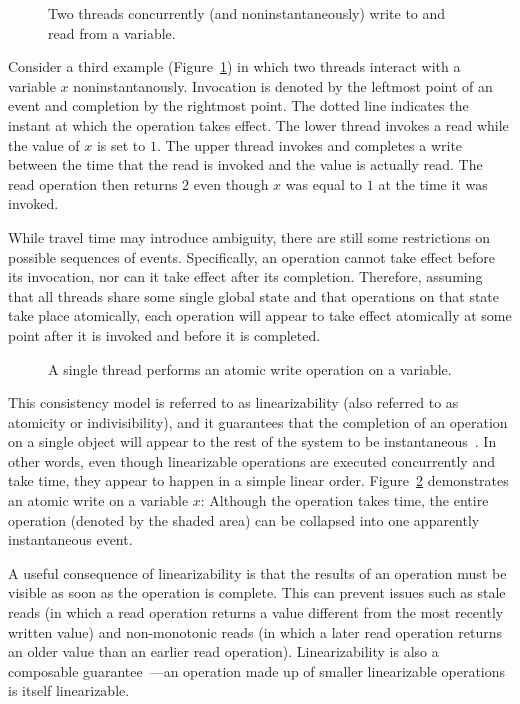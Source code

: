 \documentclass{sig-alternate}
\begin{document}
\begin{figure}[h]
  \centering
  \resizebox{0.63\linewidth}{!}{}
  \caption{Two threads concurrently (and noninstantaneously) write to and read from a variable.}
\label{figure:time}
\end{figure}

Consider a third example (Figure~\ref{figure:time}) in which two threads interact with a variable $x$ noninstantanously. Invocation is denoted by the leftmost point of an event and completion by the rightmost point. The dotted line indicates the instant at which the operation takes effect. The lower thread invokes a read while the value of $x$ is set to $1$. The upper thread invokes and completes a write between the time that the read is invoked and the value is actually read. The read operation then returns $2$ even though $x$ was equal to $1$ at the time it was invoked.

While travel time may introduce ambiguity, there are still some restrictions on possible sequences of events. Specifically, an operation cannot take effect before its invocation, nor can it take effect after its completion. Therefore, assuming that all threads share some single global state and that operations on that state take place atomically, each operation will appear to take effect atomically at some point after it is invoked and before it is completed.

\begin{figure}[h]
  \centering
  \resizebox{0.63\linewidth}{!}{}
  \caption{A single thread performs an atomic write operation on a variable.}
\label{figure:linearizability}
\end{figure}

This consistency model is referred to as linearizability (also referred to as atomicity or indivisibility), and it guarantees that the completion of an operation on a single object will appear to the rest of the system to be instantaneous~\cite{Herlihy1990}. In other words, even though linearizable operations are executed concurrently and take time, they appear to happen in a simple linear order. Figure~\ref{figure:linearizability} demonstrates an atomic write on a variable $x$: Although the operation takes time, the entire operation (denoted by the shaded area) can be collapsed into one apparently instantaneous event.

A useful consequence of linearizability is that the results of an operation must be visible as soon as the operation is complete. This can prevent issues such as stale reads (in which a read operation returns a value different from the most recently written value) and non-monotonic reads (in which a later read operation returns an older value than an earlier read operation). Linearizability is also a composable guarantee~\cite{Herlihy1990}---an operation made up of smaller linearizable operations is itself linearizable.
\end{document}
